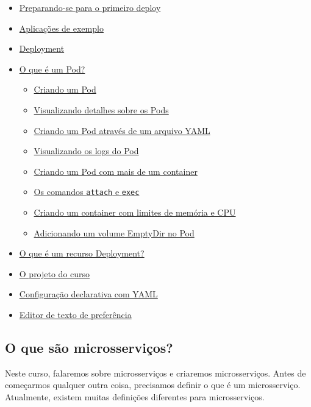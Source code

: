 \documentclass[12pt,a4paper]{article}
\begin{document}
\begin{itemize}
\begin{itemize}
\begin{itemize}
      \item \hyperref[sec:prep_deploy]{Preparando-se para o primeiro deploy}
      \item \hyperref[sec:exemplos]{Aplicações de exemplo}
      \item \hyperref[sec:deployment]{Deployment}
      \item \hyperref[sec:pod]{O que é um Pod?}
      \begin{itemize}
        \item \hyperref[sec:criando_pod]{Criando um Pod}
        \item \hyperref[sec:visualizando_pod]{Visualizando detalhes sobre os Pods}
        \item \hyperref[sec:pod_yaml]{Criando um Pod através de um arquivo YAML}
        \item \hyperref[sec:logs_pod]{Visualizando os logs do Pod}
        \item \hyperref[sec:pod_multi]{Criando um Pod com mais de um container}
        \item \hyperref[sec:attach_exec]{Os comandos \texttt{attach} e \texttt{exec}}
        \item \hyperref[sec:pod_limit]{Criando um container com limites de memória e CPU}
        \item \hyperref[sec:emptydir]{Adicionando um volume EmptyDir no Pod}
      \end{itemize}
      \item \hyperref[sec:recurso_deploy]{O que é um recurso Deployment?}
      \item \hyperref[sec:projeto]{O projeto do curso}
      \item \hyperref[sec:yaml]{Configuração declarativa com YAML}
      \item \hyperref[sec:editor]{Editor de texto de preferência}
    \end{itemize}
  \end{itemize}
\end{itemize}

\vspace{1em}

\subsection{O que são microsserviços?}
\label{sec:micro}
Neste curso, falaremos sobre microsserviços e criaremos microsserviços. Antes de começarmos qualquer outra coisa, precisamos definir o que é um microsserviço. Atualmente, existem muitas definições diferentes para microsserviços.
\end{document}
